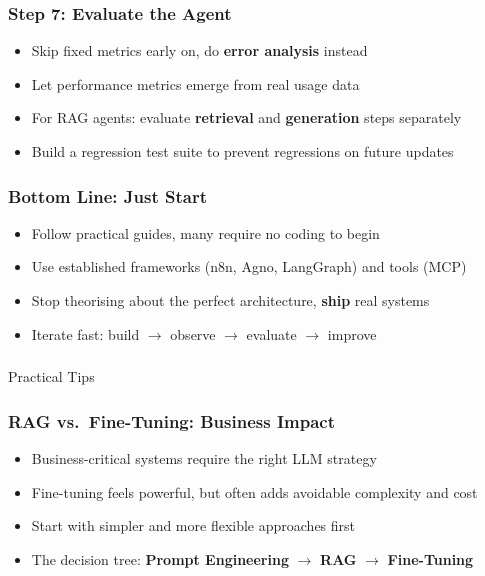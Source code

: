 \begin{frame}[fragile]\frametitle{Step 7: Evaluate the Agent}
      \begin{itemize}
        \item Skip fixed metrics early on, do \textbf{error analysis} instead
        \item Let performance metrics emerge from real usage data
        \item For RAG agents: evaluate \textbf{retrieval} and \textbf{generation} steps separately
        \item Build a regression test suite to prevent regressions on future updates
      \end{itemize}
\end{frame}

\begin{frame}[fragile]\frametitle{Bottom Line: Just Start}
      \begin{itemize}
        \item Follow practical guides, many require no coding to begin
        \item Use established frameworks (n8n, Agno, LangGraph) and tools (MCP)
        \item Stop theorising about the perfect architecture, \textbf{ship} real systems
        \item Iterate fast: build $\rightarrow$ observe $\rightarrow$ evaluate $\rightarrow$ improve
      \end{itemize}
\end{frame}


\begin{frame}[fragile]\frametitle{}
\begin{center}
{\Large Practical Tips}
\end{center}
\end{frame}

\begin{frame}[fragile]\frametitle{RAG vs.\ Fine-Tuning: Business Impact}
    \begin{itemize}
        \item Business-critical systems require the right LLM strategy
        \item Fine-tuning feels powerful, but often adds avoidable complexity and cost
        \item Start with simpler and more flexible approaches first
        \item The decision tree: \textbf{Prompt Engineering} $\rightarrow$ \textbf{RAG} $\rightarrow$ \textbf{Fine-Tuning}
    \end{itemize}
\end{frame}

